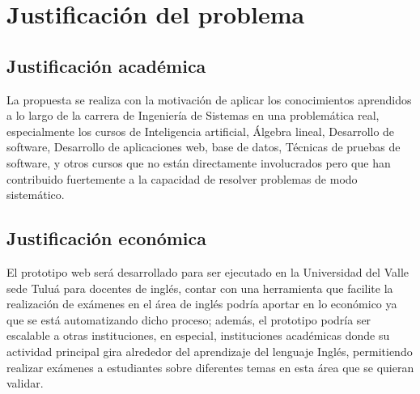 \documentclass[../Main.tex]{subfiles}
\begin{document}
\section{Justificación del problema}




\subsection{Justificación académica}
\begin{justify}
La propuesta se realiza con la motivación de aplicar los conocimientos aprendidos a lo largo de la carrera de Ingeniería de Sistemas en una problemática real, especialmente los cursos de Inteligencia artificial, Álgebra lineal, Desarrollo de software, Desarrollo de aplicaciones web, base de datos, Técnicas de pruebas de software, y otros cursos que no están directamente involucrados pero que han contribuido fuertemente a la capacidad de resolver problemas de modo sistemático.
\end{justify}\par

\subsection{Justificación económica}
\begin{justify}
El prototipo web será desarrollado para ser ejecutado en la Universidad del Valle sede Tuluá para docentes de inglés, contar con una herramienta que facilite la realización de exámenes  en el área de inglés podría aportar en lo económico ya que se está automatizando dicho proceso; además, el prototipo podría ser escalable a otras instituciones, en especial, instituciones académicas donde su actividad principal gira alrededor del aprendizaje del lenguaje Inglés, permitiendo realizar exámenes a estudiantes sobre diferentes temas en esta área que se quieran validar.
\end{justify}\par
\end{document}
